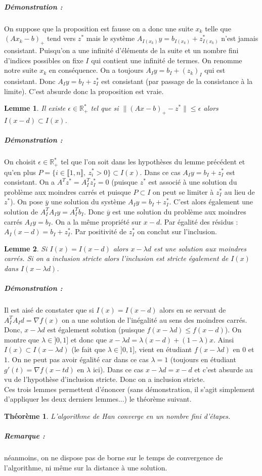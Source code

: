 \documentclass[10pt,a4paper]{article}
\newtheorem{thm}{Théorème}
\newtheorem{lemma}{Lemme}
\begin{document}
\subparagraph{Démonstration :} On suppose que la proposition est fausse on a donc une suite $x_k$ telle que $(Ax_k-b)_+$ tend vers $z^*$ mais le système $A_{I(x_k)}y=b_{I(x_k)}+z_{I(x_k)}^*$ n'est jamais consistant.
Puisqu'on a une infinité d'éléments de la suite et un nombre fini d'indices possibles on fixe $I$ qui contient une infinité de termes.
On renomme notre suite $x_k$ en conséquence.
On a toujours $A_Iy=b_I+(z_k)_I$ qui est consistant.
Donc $A_Iy=b_I+z^*_I$ est consistant (par passage de la consistance à la limite).
C'est absurde donc la proposition est vraie.
\begin{lemma}
Il existe $\epsilon \in \mathbb{R}_+^*$ tel que si $\| (Ax-b)_+ -z^*\| \le \epsilon$ alors $I(x-d) \subset I(x)$.
\end{lemma}
\subparagraph{Démonstration :} On choisit $\epsilon \in \mathbb{R}_+^*$ tel que l'on soit dans les hypothèses du lemme précédent et qu'en plus $P=\lbrace i \in \llbracket 1,n \rrbracket, \ z_i^* >0 \rbrace \subset I(x)$.
Dans ce cas $A_I y =b_I +z_I^*$ est consistant.
On a $A^T z^* =A_I^T z_I^* =0$ (puisque $z^*$ est associé à une solution du problème aux moindres carrés et puisque $P \subset I$ on peut se limiter à $z_I^*$ au lieu de $z^*$).
On pose $\overline{y}$ une solution du système $A_Iy=b_I+z_I^*$.  C'est alors également une solution de $A_I^TA_Iy=A_I^Tb_I$.
Donc $\overline{y}$ est une solution du problème aux moindres carrés $A_Iy=b_I$.
On a la même propriété sur $x-d$.
Par égalité des résidus : $A_I(x-d)=b_I+z_I^*$.
Par positivité de $z_I^*$ on conclut sur l'inclusion.
\begin{lemma}
Si $I(x)=I(x-d)$ alors $x-\lambda d$ est une solution aux moindres carrés.
Si on a inclusion stricte alors l'inclusion est stricte également de $I(x)$ dans $I(x-\lambda d)$.
\end{lemma}
\subparagraph{Démonstration :} Il est aisé de constater que si $I(x)=I(x-d)$ alors en se servant de $A_I^TA_I d= \nabla f(x)$ on a une solution de l'inégalité au sens des moindres carrés.
Donc, $x-\lambda d$ est également solution (puisque $f(x-\lambda d) \le f(x-d)$).
On montre que $\lambda \in ]0,1]$ et donc que $x-\lambda d= \lambda (x-d) +(1-\lambda) x$.
Ainsi $I(x) \subset I(x -\lambda d)$ (le fait que $\lambda \in ]0,1]$, vient en étudiant $f(x-\lambda d)$ en $0$ et $1$.
On ne peut pas avoir égalité car dans ce cas $\lambda=1$ (toujours en étudiant $g'(t)=\nabla f(x-td)$ en $\lambda$ ici).
Dans ce cas $x-\lambda d =x- d$ et c'est absurde au vu de l'hypothèse d'inclusion stricte.
Donc on a inclusion stricte.\\
Ces trois lemmes permettent d'énoncer (sans démonstration, il s'agit simplement d'appliquer les deux derniers lemmes...) le théorème suivant.
\begin{thm}
L'algorithme de Han converge en un nombre fini d'étapes.
\end{thm}
\subparagraph{Remarque :} néanmoins, on ne dispose pas de borne sur le temps de convergence de l'algorithme, ni même sur la distance à une solution.
\end{document}
